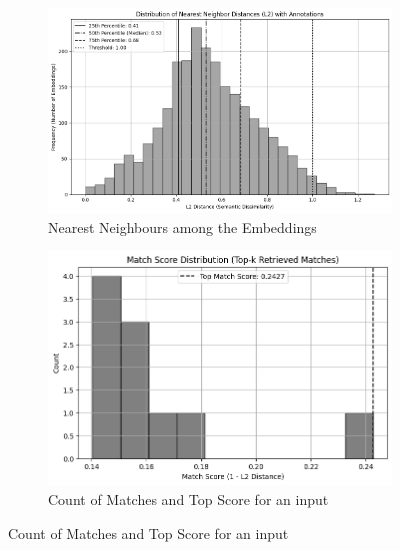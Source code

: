 \begin{figure}[H]
  \centering

  \begin{subfigure}[b]{0.4975\textwidth}
    \centering
    \hspace*{-0.1\textwidth}%
    \includegraphics[width=1.09\textwidth]{Images/RAG_NEAR.png}
    \vspace{-0.35cm}
    \caption*{Nearest Neighbours among the Embeddings}
    \label{fig:wellbeing_result}
  \end{subfigure}
  \hfill
  \begin{subfigure}[b]{0.496\textwidth}
    \centering
    \includegraphics[width=\textwidth]{Images/RAG_MATCHSCORE.png}
    \vspace{-0.5cm}
    \caption*{Count of Matches and Top Score for an input}
    \label{fig:wellbeing_questions}
  \end{subfigure}

  \label{fig:wellbeing_comparison}
\end{figure}



